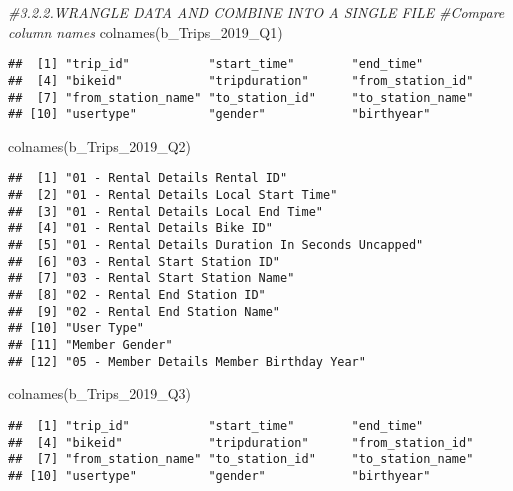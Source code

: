 \documentclass[
]{article}
\newenvironment{Shaded}{\begin{snugshade}}{\end{snugshade}}
\newcommand{\CommentTok}[1]{\textcolor[rgb]{0.56,0.35,0.01}{\textit{#1}}}
\newcommand{\FunctionTok}[1]{\textcolor[rgb]{0.00,0.00,0.00}{#1}}
\newcommand{\NormalTok}[1]{#1}
\begin{document}
\begin{Shaded}
\begin{Highlighting}[]
\CommentTok{\#3.2.2.WRANGLE DATA AND COMBINE INTO A SINGLE FILE}
\CommentTok{\#Compare column names}
\FunctionTok{colnames}\NormalTok{(b\_Trips\_2019\_Q1)}
\end{Highlighting}
\end{Shaded}

\begin{verbatim}
##  [1] "trip_id"           "start_time"        "end_time"         
##  [4] "bikeid"            "tripduration"      "from_station_id"  
##  [7] "from_station_name" "to_station_id"     "to_station_name"  
## [10] "usertype"          "gender"            "birthyear"
\end{verbatim}

\begin{Shaded}
\begin{Highlighting}[]
\FunctionTok{colnames}\NormalTok{(b\_Trips\_2019\_Q2)}
\end{Highlighting}
\end{Shaded}

\begin{verbatim}
##  [1] "01 - Rental Details Rental ID"                   
##  [2] "01 - Rental Details Local Start Time"            
##  [3] "01 - Rental Details Local End Time"              
##  [4] "01 - Rental Details Bike ID"                     
##  [5] "01 - Rental Details Duration In Seconds Uncapped"
##  [6] "03 - Rental Start Station ID"                    
##  [7] "03 - Rental Start Station Name"                  
##  [8] "02 - Rental End Station ID"                      
##  [9] "02 - Rental End Station Name"                    
## [10] "User Type"                                       
## [11] "Member Gender"                                   
## [12] "05 - Member Details Member Birthday Year"
\end{verbatim}

\begin{Shaded}
\begin{Highlighting}[]
\FunctionTok{colnames}\NormalTok{(b\_Trips\_2019\_Q3)}
\end{Highlighting}
\end{Shaded}

\begin{verbatim}
##  [1] "trip_id"           "start_time"        "end_time"         
##  [4] "bikeid"            "tripduration"      "from_station_id"  
##  [7] "from_station_name" "to_station_id"     "to_station_name"  
## [10] "usertype"          "gender"            "birthyear"
\end{verbatim}
\end{document}
